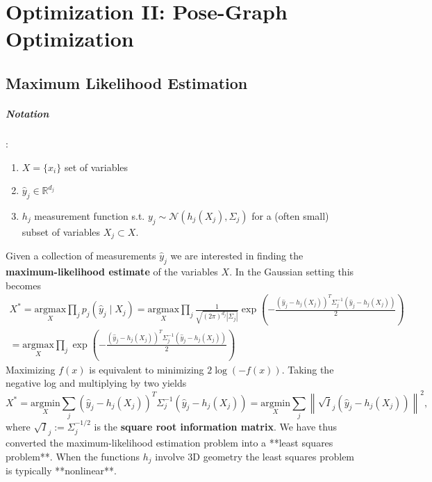 
\chapter{Optimization II: Pose-Graph Optimization}

\section{Maximum Likelihood Estimation}

\paragraph{Notation}:

\begin{enumerate}
  \item $X = \{ x_i \}$ set of variables
  \item $\hat y_j \in \mathbb{R}^{d_j}$
  \item $h_j$ measurement function s.t. $y_j \sim \mathcal N (h_j(X_j), \Sigma_j)$ for a (often small) subset of variables $X_j \subset X$.
\end{enumerate}
  

Given a collection of measurements $\hat y_j$ we are interested in finding the \textbf{maximum-likelihood estimate} of the variables $X$. In the Gaussian setting this becomes
$$
\begin{aligned}
  X^* = \underset{X}{\textrm{argmax}} \prod_{j} p_j(\hat y_j \mid X_j) = \underset{X}{\textrm{argmax}} \prod_j \frac{1}{\sqrt{ (2 \pi)^{d_j} |\Sigma_j|}} \exp \left( - \frac{(\hat y_j - h_j(X_j))^T \Sigma_j^{-1} (\hat y_j - h_j(X_j))}{2} \right) \\ 
= \underset{X}{\textrm{argmax}} \prod_j \exp \left( - \frac{(\hat y_j - h_j(X_j))^T \Sigma_j^{-1} (\hat y_j - h_j(X_j))}{2} \right)
\end{aligned}
$$
Maximizing $f(x)$ is equivalent to minimizing $2 \log(-f(x))$. Taking the negative log and multiplying by two yields
$$
  X^* = \underset{X}{\textrm{argmin}} \sum_j (\hat y_j - h_j(X_j))^T \Sigma_j^{-1} (\hat y_j - h_j(X_j)) = \underset{X}{\textrm{argmin}} \sum_j \left\| \sqrt{I}_j \left( \hat y_j - h_j(X_j) \right) \right\|^2,
$$
where $\sqrt{I}_j := \Sigma_j^{-1/2}$ is the \textbf{square root information matrix}. We have thus converted the maximum-likelihood estimation problem into a **least squares problem**. When the functions $h_j$  involve 3D geometry the least squares problem is typically **nonlinear**.

